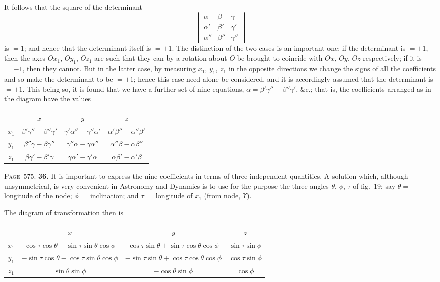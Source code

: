\documentclass[11pt,a4paper]{book}
\begin{document}
It follows that the square of the determinant
\[
\begin{vmatrix}
\alpha & \beta & \gamma \\
\alpha' & \beta' & \gamma' \\
\alpha'' & \beta'' & \gamma''
\end{vmatrix}
\]
is $=1$; and hence that the determinant itself is $=\pm 1$. The distinction of the two cases is an important one: if the determinant is $=+1$, then the axes $Ox_1$, $Oy_1$, $Oz_1$ are such that they can by a rotation about $O$ be brought to coincide with $Ox$, $Oy$, $Oz$ respectively; if it is $=-1$, then they cannot. But in the latter case, by measuring $x_1$, $y_1$, $z_1$ in the opposite directions we change the signs of all the coefficients and so make the determinant to be $=+1$; hence this case need alone be considered, and it is accordingly assumed that the determinant is $=+1$. This being so, it is found that we have a further set of nine equations, $\alpha=\beta'\gamma''-\beta''\gamma'$, \&c.; that is, the coefficients arranged as in the diagram have the values
\begin{center}
\begin{tabular}{c|ccc}
& $x$ & $y$ & $z$ \\
\hline
$x_1$ & $\beta'\gamma''-\beta''\gamma'$ & $\gamma'\alpha''-\gamma''\alpha'$ & $\alpha'\beta''-\alpha''\beta'$ \\
$y_1$ & $\beta''\gamma-\beta\gamma''$ & $\gamma''\alpha-\gamma\alpha''$ & $\alpha''\beta-\alpha\beta''$ \\
$z_1$ & $\beta\gamma'-\beta'\gamma$ & $\gamma\alpha'-\gamma'\alpha$ & $\alpha\beta'-\alpha'\beta$ \\
\end{tabular}
\end{center}

\newpage
\noindent\textsc{Page~575.} \textbf{36.} It is important to express the nine coefficients in terms of three independent quantities. A solution which, although unsymmetrical, is very convenient in Astronomy and Dynamics is to use for the purpose the three angles $\theta$, $\phi$, $\tau$ of fig.~19; say $\theta=$ longitude of the node; $\phi=$ inclination; and $\tau=$ longitude of $x_1$ (from node, $\Upsilon$).

The diagram of transformation then is
\begin{center}
\begin{tabular}{c|ccc}
& $x$ & $y$ & $z$ \\
\hline
$x_1$ & $\cos\tau\cos\theta-\sin\tau\sin\theta\cos\phi$ & $\cos\tau\sin\theta+\sin\tau\cos\theta\cos\phi$ & $\sin\tau\sin\phi$ \\
$y_1$ & $-\sin\tau\cos\theta-\cos\tau\sin\theta\cos\phi$ & $-\sin\tau\sin\theta+\cos\tau\cos\theta\cos\phi$ & $\cos\tau\sin\phi$ \\
$z_1$ & $\sin\theta\sin\phi$ & $-\cos\theta\sin\phi$ & $\cos\phi$ \\
\end{tabular}
\end{center}
\end{document}
